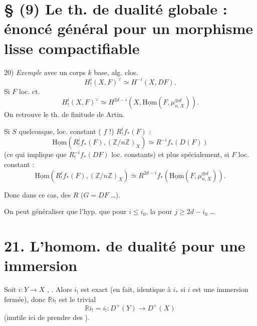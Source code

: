 \documentclass[11pt,a4paper]{article}
\begin{document}
\section{§ (9) Le th. de dualité globale : énoncé général pour un morphisme lisse compactifiable}

20) \emph{Exemple} \struck{\ill{}} avec un corps $k$ base, alg. clos.
\[
H^i_!(X, F)^\vee \simeq H^{-i}(X, DF).
\]
Si $F$ loc. ct.
\[
H^i_!(X, F)^\vee \simeq H^{2d-i}(X, \underline{\mathrm{Hom}}(F, \mu_{n,X}^{\otimes d})).
\]
On retrouve le th. de finitude de Artin.

Si $S$ quelconque, \ill{} \ill{} \ill{} \ill{} \ill{} loc. constant
( $f$  !)
$R^i_! f_*(F)$ \ill{} \ill{} :
\[
\underline{\mathrm{Hom}}(R^i_! f_*(F), (\mathbb{Z}/n\mathbb{Z})_X) \simeq R^{-i} f_*(D(F))
\]
(ce qui implique que $R^{-i}_! f_*(DF)$ \ill{} loc. constants) et plus
spécialement, si $F$  loc. constant :
\[
\underline{\mathrm{Hom}}(R^i_! f_*(F), (\mathbb{Z}/n\mathbb{Z})_X)
\simeq R^{2d-i} f_*(\underline{\mathrm{Hom}}(F, \mu_{n,X}^{\otimes d})).
\]

Donc dans ce cas, \ill{}  \ill{} \ill{}
  des
$R$\struck{\ill{}}  \ill{}
($G = DF$ …).

On peut généraliser \ill{}  que l'hyp. \ill{}
 que pour $i \le i_0$, la 
\ill{}  pour $j \ge 2d - i_0$ …


\section{21. L'homom. de dualité pour une immersion}

Soit $i : Y \to X$ \ill{}, \ill{} \ill{}. Alors $i_!$ est exact (en fait,
identique à $i_*$ si $i$ est une immersion fermée), donc $\mathbb{R} i_!$ est
le  trivial
\[
\mathbb{R} i_! = i_! : D^+(Y) \longrightarrow D^+(X)
\]
(inutile ici de prendre des ).
\end{document}
